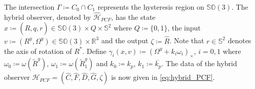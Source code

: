\documentclass{article}
\newcommand{\SOthree}{\mathbb{SO}(3)}
\newcommand{\sothree}{\mathfrak{so}(3)}
\newcommand{\R}[1]{\mathbb{R}^{#1}}
\newcommand{\Omegay}{\Omega^y}
\newcommand{\Rtilde}{\tilde{R}}
\newcommand{\normSOthree}[1]{{{\vert}#1 {\vert}_I}}
\newcommand{\Rstar}{{R^*}}
\begin{document}


The intersection $\Gamma \coloneqq C_0\cap C_1$ represents the hysteresis region on $\SOthree$. The hybrid observer, denoted by $\hat{\mathcal{H}}_{PCF}$, has the state $x \coloneqq (\hat{R}, q, r) \in \SOthree \times Q \times \mathbb{S}^2$ where $Q\coloneqq \{0,1\}$, the input $v \coloneqq (R^y, \Omega^y)\in \SOthree\times \R{3}$ and the output $\zeta \coloneqq \hat{R}$. Note that $r\in\mathbb{S}^2$ denotes the axis of rotation of $\Rstar$. Define $\gamma_i(x, v) \coloneqq (\Omegay + k_i\omega_i)_\times$, $i=0,1$ where $\omega_0 \coloneqq \omega(\Rtilde^y)$, $\omega_1 \coloneqq \omega(\Rtilde_1^y)$ and $k_0 \coloneqq k_p$, $k_1\coloneqq \overline{k_p}$. The data of the hybrid observer $\mathcal{H}_{PCF} = (\hat{C}, \hat{F}, \hat{D}, \hat{G}, \zeta)$ is now given in \eqref{eq:hybrid_PCF}. 
\end{document}
